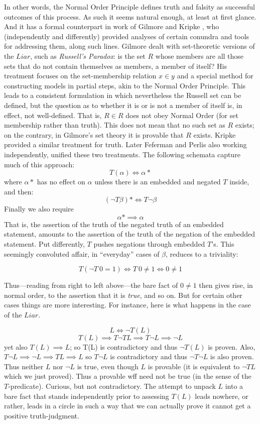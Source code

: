 \documentclass{amsart}
\begin{document}
In other words, the Normal Order
Principle defines truth and falsity as successful outcomes of this process.
As such it seems natural enough, at least at first
glance. And it has a formal counterpart in work of Gilmore
\cite{gilmore:consistency} and Kripke \cite{kripke:outline},
who (independently and differently) provided analyses of certain
conundra and tools for addressing them, along such lines.  Gilmore dealt with
set-theoretic versions of the $Liar$, such as {\em Russell's Paradox}:
is the set $R$ whose members are all those sets that do not contain themselves
as members, a member of itself?  His treatment focuses on the
set-membership relation $x \in y$ and a special method for
constructing models in partial steps, akin to the
Normal Order Principle. This leads to a consistent formulation 
in which nevertheless the Russell set can be defined, but the
question as to whether it is or is not a member of itself is, in
effect, not well-defined. That is, $R \in R$ does not obey
Normal Order (for set membership rather
than truth). This does not mean that no such set as $R$ exists; on the
contrary, in Gilmore's set theory it is provable that $R$ exists. 
Kripke provided a similar treatment for truth. Later
Feferman \cite{feferman:toward} and Perlis \cite{perlis:languages1,perlis:languages2} also working independently,
unified these two 
treatments.  The following schemata capture much of this approach:
$$T(\alpha) \iff \alpha *$$
where $\alpha *$ has no effect on $\alpha$ unless there is an embedded
and negated $T$ inside, and then:
$$(\neg T \beta)* \iff T \neg \beta$$
Finally we also require
$$\alpha * \implies \alpha$$
\noindent
That is, the assertion of the truth of the negated truth of an embedded
statement, amounts to the assertion of the truth of the
negation of the embedded statement. Put differently, $T$ pushes
negations through embedded $T$'s.  This seemingly convoluted affair,
in ``everyday'' cases of $\beta$, reduces to a triviality:

$$T(\neg T ~0=1) \iff T ~0 \not = 1 \iff 0 \not = 1$$

Thus---reading from right to left above---the bare fact of $ 0 \not =1$
then gives rise, in normal order, to the assertion that it is {\em
true}, and so on.
But for certain other cases things are more interesting. For instance,
here is what happens in the case of the $Liar$.

$$L \iff \neg T(L)$$
$$T(L) \implies T \neg T L \implies T \neg L \implies \neg L$$
yet also $T(L) \implies L$; so T(L) is contradictory and thus $\neg
T(L)$ is proven.  Also, $T \neg L \implies \neg L \implies T L \implies L$
so $T \neg L$ is contradictory and thus $\neg T \neg L$ is also
proven. Thus neither $L$ nor $\neg L$ is true, even though $L$ is
provable (it is equivalent to $\neg T L$ which we just proved). Thus a
provable wff need not be true (in the sense of the $T$-predicate).
Curious, but not contradictory.  The attempt to unpack $L$ into a bare
fact that stands independently prior to assessing $T(L)$ leads
nowhere, or rather, leads in a circle in such a way that we can
actually prove it cannot get a positive truth-judgment. 
\end{document}
